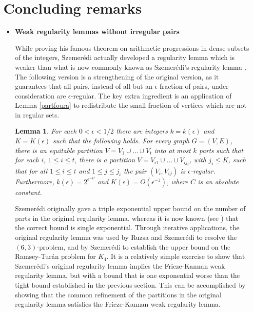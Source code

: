 \documentclass[11pt]{article}
\newtheorem{lemma}{Lemma}[section]
\begin{document}
\section{Concluding remarks}
\begin{itemize}
\item{\bf Weak regularity lemmas without irregular pairs}

While proving his famous theorem on arithmetic progressions in dense subsets of
the integers, Szemer\'edi \cite{Sz1} actually developed a regularity lemma
which is weaker than what is now commonly known as Szemer\'edi's regularity
lemma \cite{Sz}. The following version is a strengthening of the original
version, as it guarantees that all pairs, instead of all but an
$\epsilon$-fraction of pairs, under consideration are $\epsilon$-regular. The
key extra ingredient is an application of Lemma \ref{partfoura} to redistribute
the small fraction of vertices which are not in regular sets.

\begin{lemma}\label{strongoriginal}
For each $0<\epsilon<1/2$ there are integers $k=k(\epsilon)$ and
$K=K(\epsilon)$ such that the following holds. For every graph $G=(V,E)$, there
is an equitable partition $V=V_1 \cup \ldots \cup V_t$ into at most $k$ parts
such that for each $i$, $1 \leq i \leq t$, there is a partition $V=V_{i1} \cup
\ldots \cup V_{ij_i}$, with $j_i \leq K$,
such that for all $1 \leq i \leq t$ and $1 \leq j \leq j_i$ the pair
$(V_i,V_{ij})$ is $\epsilon$-regular. Furthermore,
$k(\epsilon)=2^{\epsilon^{-C}}$ and $K(\epsilon) = O(\epsilon^{-1})$, where $C$
is an absolute constant.
\end{lemma}

Szemer\'edi \cite{Sz1} originally gave a triple exponential upper bound on the
number of parts in the original regularity lemma, whereas it is now known (see
\cite{RoSc}) that the correct bound is single exponential. Through iterative
applications, the original regularity lemma was used by Ruzsa and Szemer\'edi
\cite{RuSz} to resolve the $(6,3)$-problem, and by Szemer\'edi \cite{Sz73} to
establish the upper bound on the Ramsey-Tur\'an problem for $K_4$. It is a
relatively simple exercise to show that Szemer\'edi's original regularity lemma
implies the Frieze-Kannan weak regularity lemma, but with a bound that is one
exponential worse than the tight bound established in the previous section.
This can be accomplished by showing that the common refinement of the
partitions in the original regularity lemma satisfies the Frieze-Kannan weak
regularity lemma.


\end{itemize}
\end{document}
